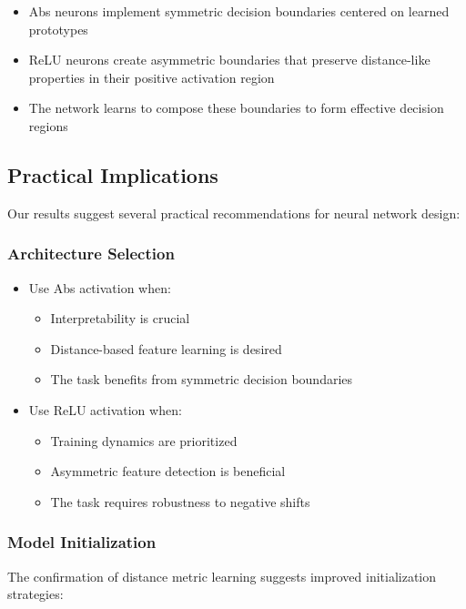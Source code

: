 \begin{itemize}
    \item Abs neurons implement symmetric decision boundaries centered on learned prototypes
    \item ReLU neurons create asymmetric boundaries that preserve distance-like properties in their positive activation region
    \item The network learns to compose these boundaries to form effective decision regions
\end{itemize}

\subsection{Practical Implications}

Our results suggest several practical recommendations for neural network design:

\subsubsection{Architecture Selection}
\begin{itemize}
    \item Use Abs activation when:
        \begin{itemize}
            \item Interpretability is crucial
            \item Distance-based feature learning is desired
            \item The task benefits from symmetric decision boundaries
        \end{itemize}
    \item Use ReLU activation when:
        \begin{itemize}
            \item Training dynamics are prioritized
            \item Asymmetric feature detection is beneficial
            \item The task requires robustness to negative shifts
        \end{itemize}
\end{itemize}

\subsubsection{Model Initialization}
The confirmation of distance metric learning suggests improved initialization strategies:

